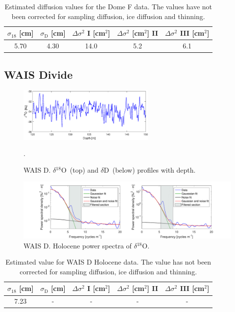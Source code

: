 \documentclass[11pt, draftcls, onecolumn]{IEEEtran} %
\numberwithin{equation}{section}
\numberwithin{table}{section}
\numberwithin{figure}{section}
\newcommand{\delOx}{$\delta{}^{18}\mathrm{O}$}
\newcommand{\delD}{$\delta\mathrm{D}$}
\begin{document}
\begin{appendices}
\begin{table}[H]
	\center
	\caption{Estimated diffusion values for the Dome F data.
		The values have not been corrected for sampling diffusion, ice diffusion and thinning.}
	\label{DomeF}
	\begin{tabular}{c c c c c} 
		\toprule
		$\sigma_{18}$ [cm] & $\sigma_\mathrm{D}$ [cm] & $\Delta\sigma^2$ I [cm$^2$] & $\Delta\sigma^2$ [cm$^2$] II & $\Delta\sigma^2$ III [cm$^2$] \\
		\midrule
		5.70 &   4.30 &    14.0 &     5.2 &     6.1 \\
		\bottomrule		
	\end{tabular}
\end{table}

\clearpage

\subsection{WAIS Divide}

\begin{figure}[H]
	\vspace*{2mm}
	\begin{center}
		\includegraphics[width=0.6\textwidth]{Wais_D_late}
		\caption{WAIS D. \delOx~(top) and \delD~(below) profiles with depth.}  \label{fig:DomeC_holo}.
	\end{center}
\end{figure}

\begin{figure}[H]
	\vspace*{2mm}
	\begin{center}
		\includegraphics[width=.5\textwidth]{Figure_37}
		\caption{WAIS D. Holocene power spectra of \delOx.}  \label{fig:WAIS_D}
	\end{center}
\end{figure}

\begin{table}[H]
	\center
	\caption{Estimated value for WAIS D Holocene data.
		The value has not been corrected for sampling diffusion, ice diffusion and thinning.}
	\label{WAIS_D}
	\begin{tabular}{c c c c c} 
		\toprule
		$\sigma_{18}$ [cm] & $\sigma_\mathrm{D}$ [cm] & $\Delta\sigma^2$ I [cm$^2$] & $\Delta\sigma^2$ [cm$^2$] II & $\Delta\sigma^2$ III [cm$^2$] \\
		\midrule
		7.23 &   - &    - &     - &     - \\
		\bottomrule		
	\end{tabular}
\end{table}

\end{appendices}





\end{document}
